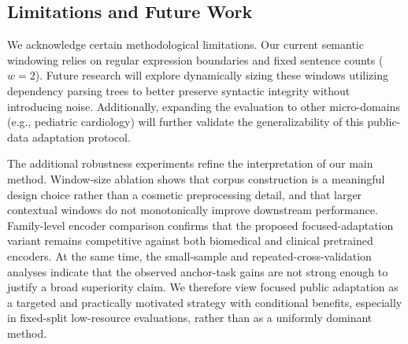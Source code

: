 \documentclass[a4paper,fleqn]{cas-dc}
\begin{document}
\subsection{Limitations and Future Work}
We acknowledge certain methodological limitations. Our current semantic windowing relies on regular expression boundaries and fixed sentence counts ($w=2$). Future research will explore dynamically sizing these windows utilizing dependency parsing trees to better preserve syntactic integrity without introducing noise. Additionally, expanding the evaluation to other micro-domains (e.g., pediatric cardiology) will further validate the generalizability of this public-data adaptation protocol.

The additional robustness experiments refine the interpretation of our main method. Window-size ablation shows that corpus construction is a meaningful design choice rather than a cosmetic preprocessing detail, and that larger contextual windows do not monotonically improve downstream performance. Family-level encoder comparison confirms that the proposed focused-adaptation variant remains competitive against both biomedical and clinical pretrained encoders. At the same time, the small-sample and repeated-cross-validation analyses indicate that the observed anchor-task gains are not strong enough to justify a broad superiority claim. We therefore view focused public adaptation as a targeted and practically motivated strategy with conditional benefits, especially in fixed-split low-resource evaluations, rather than as a uniformly dominant method.
\end{document}

